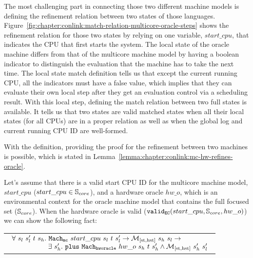 The most challenging part in connecting those two different machine models is defining the refinement relation between two states of those languages. 
Figure~\ref{fig:chapter:conlink:match-relation-multicore-oracle-steps} shows the 
refinement relation for those two states by relying on one variable, $start\_cpu$, that indicates the CPU that first starts the system. 
The local state of the oracle machine differs from that of the multicore machine model by having a boolean indicator 
to distinguish the evaluation that the machine has to take the next time.
The local state match definition tells us that except the current running CPU, all the indicators must have a false value,
which implies that they can evaluate their own local step after they get an evaluation control via a scheduling result.
 With this local step, 
defining the match relation between two full states is available.
 It tells us that 
 two states are valid matched states when all  their local states (for all CPUs) are in a proper relation as well as when the global log and  current running CPU ID are well-formed. 


%
%

With the definition, providing the proof for the refinement between two machines is possible,
which is stated in Lemma~\ref{lemma:chapter:conlink:mc-hw-refines-oracle}.
\begin{lemma}
\label{lemma:chapter:conlink:mc-hw-refines-oracle}
Let's assume that there is a valid start CPU ID for the multicore machine model, 
$start\_cpu$ ($start\_cpu \in {\mathbb{S}_{core}}$), and a hardware oracle $hw\_o$,  
which is an environmental context for the oracle machine model that contains the full focused set (${\mathbb{S}_{core}}$).
When the hardware oracle is valid ($ {{\mathrm{\texttt{valid}}}_{{\mathrm{\texttt{EC}}}}}({start\_cpu}, {{\mathbb{S}_{core}}}, {hw\_o})$) we can show the following fact:
\begin{center}
\begin{tabular}{P{0.95\textwidth}}
$
\begin{array}{l}
\forall \ s_l \ s_l' \ t \ s_h . \ \hardwarestep{start\_cpu}{s_l}{t}{s_l'} \rightarrow  \matchstatehstate{s_h}{s_l} \rightarrow \\
\ \ \ \ \ \ \ \ \ \ \ \ \ \ \ \ \exists\ s_h' . \  \ccplusstep{\oraclestep{hw\_o}{s_h}{t}{s_h'}} \wedge  \matchstatehstate{s_h'}{s_l'}\\
\end{array}
$
\end{tabular}
\end{center}
\end{lemma}

